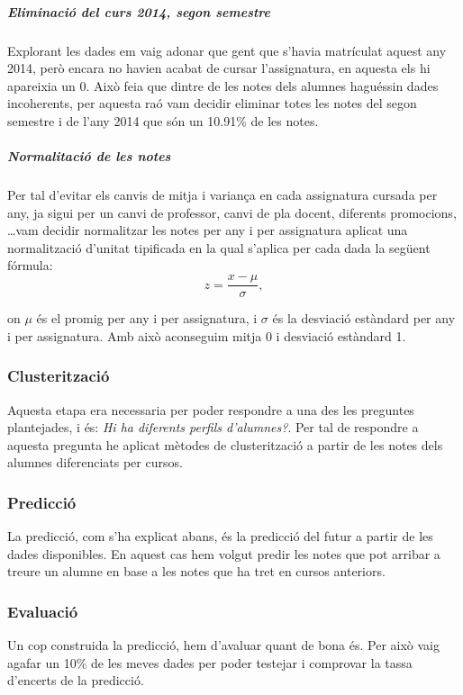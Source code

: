\documentclass[11pt,a4paper,catalan]{article}
\begin{document}
\subparagraph{Eliminació del curs 2014, segon semestre}
Explorant les dades em vaig adonar que gent que s'havia matrículat aquest any 2014, però encara no havien acabat de cursar l'assignatura, en aquesta els hi apareixia un 0. Això feia que dintre de les notes dels alumnes haguéssin dades incoherents, per aquesta raó vam decidir eliminar totes les notes del segon semestre i de l'any 2014  que són un 10.91\% de les notes.


\subparagraph{Normalitació de les notes}
Per tal d'evitar els canvis de mitja i variança en cada assignatura cursada per any, ja sigui per un canvi de professor, canvi de pla docent, diferents promocions, \ldots vam decidir normalitzar les notes per any i per assignatura aplicat una normalització d'unitat tipificada en la qual s'aplica per cada dada la següent fórmula:
$$ z = \frac{x - \mu}{\sigma}, $$

on $\mu$ és el promig per any i per assignatura, i $\sigma$ és la desviació estàndard per any i per assignatura. Amb això aconseguim mitja 0 i desviació estàndard 1.

\subsubsection{Clusterització}
Aquesta etapa era necessaria per poder respondre a una des les preguntes plantejades, i és: \textit{Hi ha diferents perfils d'alumnes?}. Per tal de  respondre a aquesta pregunta he aplicat mètodes de clusterització a partir de les notes dels alumnes diferenciats per cursos.

\subsubsection{Predicció}
La predicció, com s'ha explicat abans, és la predicció del futur a partir de les dades disponibles. En aquest cas hem volgut predir les notes que pot arribar a treure un alumne en base a les notes que ha tret en cursos anteriors.

\subsubsection{Evaluació}
Un cop construida la predicció, hem d'avaluar quant de bona és. Per això vaig agafar un 10\% de les meves dades per poder testejar i comprovar la tassa d'encerts de la predicció.

\newpage
\end{document}
